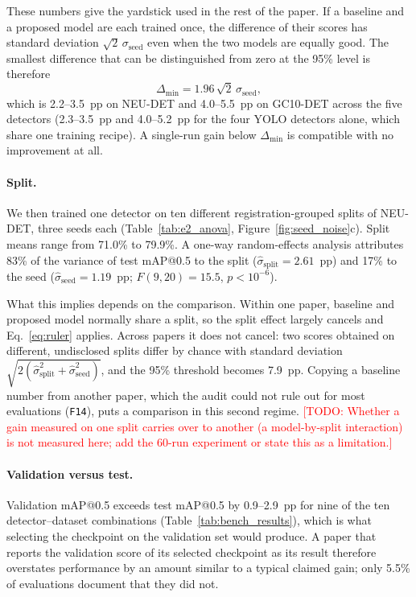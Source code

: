\documentclass[pdflatex,sn-apa]{sn-jnl}
\newcommand{\todo}[1]{\textcolor{red}{[TODO: #1]}}
\begin{document}
These numbers give the yardstick used in the rest of the paper. If a baseline and a proposed model are each trained once, the difference of their scores has standard deviation $\sqrt{2}\,\sigma_{\text{seed}}$ even when the two models are equally good. The smallest difference that can be distinguished from zero at the 95\% level is therefore
\begin{equation}
\Delta_{\min}=1.96\,\sqrt{2}\,\sigma_{\text{seed}} ,
\label{eq:ruler}
\end{equation}
which is 2.2--3.5~pp on NEU-DET and 4.0--5.5~pp on GC10-DET across the five detectors (2.3--3.5~pp and 4.0--5.2~pp for the four YOLO detectors alone, which share one training recipe). A single-run gain below $\Delta_{\min}$ is compatible with no improvement at all.

\paragraph{Split.} We then trained one detector on ten different registration-grouped splits of NEU-DET, three seeds each (Table~\ref{tab:e2_anova}, Figure~\ref{fig:seed_noise}c). Split means range from 71.0\% to 79.9\%. A one-way random-effects analysis attributes 83\% of the variance of test mAP@0.5 to the split ($\hat{\sigma}_{\text{split}}=2.61$~pp) and 17\% to the seed ($\hat{\sigma}_{\text{seed}}=1.19$~pp; $F(9,20)=15.5$, $p<10^{-6}$).

What this implies depends on the comparison. Within one paper, baseline and proposed model normally share a split, so the split effect largely cancels and Eq.~\eqref{eq:ruler} applies. Across papers it does not cancel: two scores obtained on different, undisclosed splits differ by chance with standard deviation $\sqrt{2(\hat{\sigma}_{\text{split}}^{2}+\hat{\sigma}_{\text{seed}}^{2})}$, and the 95\% threshold becomes 7.9~pp. Copying a baseline number from another paper, which the audit could not rule out for most evaluations (\texttt{F14}), puts a comparison in this second regime. \todo{Whether a gain measured on one split carries over to another (a model-by-split interaction) is not measured here; add the 60-run experiment or state this as a limitation.}

\paragraph{Validation versus test.} Validation mAP@0.5 exceeds test mAP@0.5 by 0.9--2.9~pp for nine of the ten detector--dataset combinations (Table~\ref{tab:bench_results}), which is what selecting the checkpoint on the validation set would produce. A paper that reports the validation score of its selected checkpoint as its result therefore overstates performance by an amount similar to a typical claimed gain; only 5.5\% of evaluations document that they did not.
\end{document}
